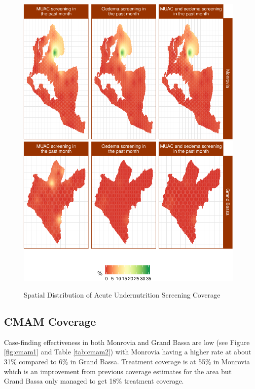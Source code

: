 \documentclass[12pt,a4paper]{article}
\theoremstyle{definition}
\theoremstyle{definition}
\theoremstyle{definition}
\theoremstyle{remark}
\begin{document}
\begin{figure}[H]

{\centering \includegraphics{liberiaCoverageReport_files/figure-latex/screenMap-1} \includegraphics{liberiaCoverageReport_files/figure-latex/screenMap-2} 

}

\caption{Spatial Distribution of Acute Undernutrition Screening Coverage}\label{fig:screenMap}
\end{figure}

\newpage

\hypertarget{cmam-coverage-1}{%
\subsection{CMAM Coverage}\label{cmam-coverage-1}}

Case-finding effectiveness in both Monrovia and Grand Bassa are low (see
Figure \ref{fig:cmam1} and Table \ref{tab:cmam2}) with Monrovia having a
higher rate at about 31\% compared to 6\% in Grand Bassa. Treatment
coverage is at 55\% in Monrovia which is an improvement from previous
coverage estimates for the area but Grand Bassa only managed to get 18\%
treatment coverage.
\end{document}
